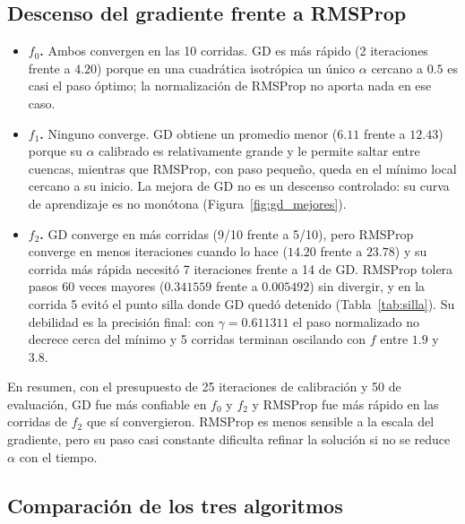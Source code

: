 \subsection{Descenso del gradiente frente a RMSProp}

\begin{itemize}
    \item \textbf{$f_0$.} Ambos convergen en las 10 corridas. GD es más
    rápido (2 iteraciones frente a $4.20$) porque en una cuadrática
    isotrópica un único $\alpha$ cercano a $0.5$ es casi el paso óptimo; la
    normalización de RMSProp no aporta nada en ese caso.
    \item \textbf{$f_1$.} Ninguno converge. GD obtiene un promedio menor
    ($6.11$ frente a $12.43$) porque su $\alpha$ calibrado es relativamente grande y le
    permite saltar entre cuencas, mientras que RMSProp, con paso pequeño,
    queda en el mínimo local cercano a su inicio. La mejora de GD no es
    un descenso controlado: su curva de aprendizaje es no monótona
    (Figura~\ref{fig:gd_mejores}).
    \item \textbf{$f_2$.} GD converge en más corridas (9/10 frente a 5/10),
    pero RMSProp converge en menos iteraciones cuando lo hace ($14.20$
    frente a $23.78$) y su corrida más rápida necesitó 7 iteraciones frente a
    14 de GD. RMSProp tolera pasos 60 veces mayores ($0.341559$ frente a
    $0.005492$) sin divergir, y en la corrida 5 evitó el punto silla donde
    GD quedó detenido (Tabla~\ref{tab:silla}). Su debilidad es la
    precisión final: con $\gamma=0.611311$ el paso normalizado no decrece
    cerca del mínimo y 5 corridas terminan oscilando con $f$ entre $1.9$ y
    $3.8$.
\end{itemize}

En resumen, con el presupuesto de 25 iteraciones de calibración y 50 de
evaluación, GD fue más confiable en $f_0$ y $f_2$ y RMSProp fue más rápido
en las corridas de $f_2$ que sí convergieron. RMSProp es menos sensible a la
escala del gradiente, pero su paso casi constante dificulta refinar la
solución si no se reduce $\alpha$ con el tiempo.

\subsection{Comparación de los tres algoritmos}

